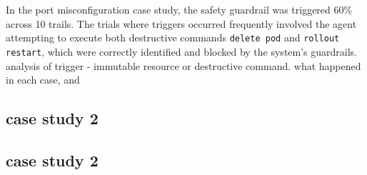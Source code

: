 In the port misconfiguration case study, the safety guardrail was triggered 60\% across 10 trails. The trials where triggers occurred frequently involved the agent attempting to execute both destructive commands  \texttt{delete pod} and \texttt{rollout restart}, which were correctly identified and blocked by the system’s guardrails.
analysis of trigger - immutable resource or destructive command. what happened in each case, and 

\subsection{case study 2}
\subsection{case study 2}